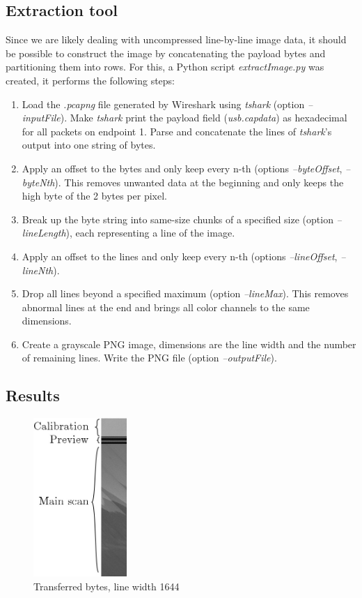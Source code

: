 \documentclass{article}
\begin{document}
\subsection{Extraction tool}

Since we are likely dealing with uncompressed line-by-line image data,
it should be possible to construct the image by concatenating the payload bytes
and partitioning them into rows. For this, a Python script {\it extractImage.py} was created,
it performs the following steps:

\begin{enumerate}
  \item Load the {\it .pcapng} file generated by Wireshark using {\it tshark} (option {\it --inputFile}).
        Make {\it tshark} print the payload field ({\it usb.capdata}) as hexadecimal for all
        packets on endpoint 1. Parse and concatenate the lines of {\it tshark}'s output into
        one string of bytes.
  
  \item Apply an offset to the bytes and only keep every n-th (options {\it --byteOffset}, {\it --byteNth}).
        This removes unwanted data at the beginning and only keeps the high byte of the 2 bytes per pixel.
  
  \item Break up the byte string into same-size chunks of a specified size (option {\it --lineLength}),
        each representing a line of the image.

  \item Apply an offset to the lines and only keep every n-th (options {\it --lineOffset}, {\it --lineNth}).
  
  \item Drop all lines beyond a specified maximum (option {\it --lineMax}). This removes abnormal lines at the
        end and brings all color channels to the same dimensions.

  \item Create a grayscale PNG image, dimensions are the line width and the number of remaining lines.
        Write the PNG file (option {\it --outputFile}).
\end{enumerate}

\subsection{Results}
\label{ssec:extract_results}

\begin{figure}[H]
  \caption{Transferred bytes, line width 1644}
  \centering
  \includegraphics[height=6cm]{images/extract_1.jpg}
\end{figure}
\end{document}
